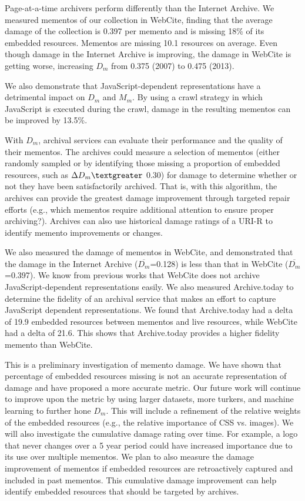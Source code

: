 Page-at-a-time archivers perform differently than the Internet Archive. We measured mementos of our collection in WebCite, finding that the average damage of the collection is 0.397 per memento and is missing 18\% of its embedded resources. Mementos are missing 10.1 resources on average. Even though damage in the Internet Archive is improving, the damage in WebCite is getting worse, increasing $D_m$ from 0.375 (2007) to 0.475 (2013). 

We also demonstrate that JavaScript-dependent representations have a detrimental impact on $D_m$ and $M_m$. By using a crawl strategy in which JavaScript is executed during the crawl, damage in the resulting mementos can be improved by 13.5\%.

With $D_m$, archival services can evaluate their performance and the quality of their mementos. The archives could measure a selection of mementos (either randomly sampled or by identifying those missing a proportion of embedded resources, such as {$\Delta D_m \textgreater$} 0.30) for damage to determine whether or not they have been satisfactorily archived. That is, with this algorithm, the archives can provide the greatest damage improvement through targeted repair efforts (e.g., which mementos require additional attention to ensure proper archiving?). Archives can also use historical damage ratings of a URI-R to identify memento improvements or changes.

We also measured the damage of mementos in WebCite, and demonstrated that the damage in the Internet Archive ($\overline{D_m}$=0.128) is less than that in WebCite ($\overline{D_m}$=0.397). We know from previous works that WebCite does not archive JavaScript-dependent representations easily. We also measured Archive.today to determine the fidelity of an archival service that makes an effort to capture JavaScript dependent representations. We found that Archive.today had a delta of 19.9 embedded resources between mementos and live resources, while WebCite had a delta of 21.6. This shows that Archive.today provides a higher fidelity memento than WebCite.

This is a preliminary investigation of memento damage. We have shown that percentage of embedded resources missing is not an accurate representation of damage and have proposed a more accurate metric.  Our future work will continue to improve upon the metric by using larger datasets, more turkers, and machine learning to further hone $D_m$. This will include a refinement of the relative weights of the embedded resources (e.g., the relative importance of CSS vs. images). We will also investigate the cumulative damage rating over time. For example, a logo that never changes over a 5 year period could have increased importance due to its use over multiple mementos. We plan to also measure the damage improvement of mementos if embedded resources are retroactively captured and included in past mementos. This cumulative damage improvement can help identify embedded resources that should be targeted by archives.



